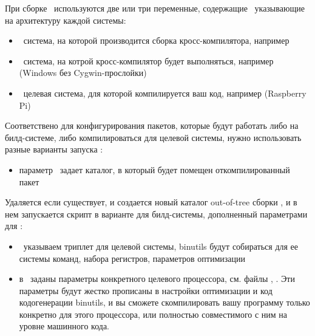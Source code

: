 При сборке \ используются две или три переменные,
содержащие \ указывающие на архитектуру каждой системы:

\begin{itemize}
  \item {}\ система, на которой производится сборка кросс-компилятора,
  например  
  \item {}\ система, на котрой кросс-компилятор будет выполняться,
  например  (Windows без Cygwin-прослойки)
  \item {}\ целевая система, для которой компилируется ваш код,
  например  (Raspberry Pi)
\end{itemize}

Соответствено для конфигурирования пакетов, которые будут работать либо на
билд-системе, либо компилироваться для целевой системы, нужно использовать
разные варианты запуска :



\begin{itemize}
  \item параметр \ задает каталог, в который будет помещен
  откомпилированный пакет
\end{itemize}




Удаляется если существует, и создается новый каталог out-of-tree сборки
, и в нем запускается скрипт 
в варианте для билд-системы, дополненный параметрами для :

\begin{itemize}
  \item {}\ указываем триплет для целевой системы, binutils будут
  собираться для ее системы команд, набора регистров, параметров оптимизации
  \item в \ заданы параметры конкретного целевого процессора, см.
   файлы , . Эти параметры будут
   жестко прописаны в настройки оптимизации и код кодогенерации binutils, и вы сможете
   скомпилировать вашу программу только конкретно для этого процессора, или
   полностью совместимого с ним на уровне машинного кода.
\end{itemize}

